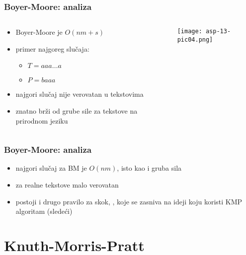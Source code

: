 \documentclass[compress,aspectratio=169]{beamer}
\begin{document}
\begin{frame}[fragile]
  \frametitle{Boyer-Moore: analiza}
  \begin{columns}
    \begin{column}[t]{8cm}
      \begin{itemize}
        \item Boyer-Moore je $O(nm+s)$
        \item primer najgoreg slučaja:
        \begin{itemize}
          \item $T = aaa \ldots a$
          \item $P = baaa$
        \end{itemize}
        \item najgori slučaj nije verovatan u tekstovima
        \item znatno brži od grube sile za tekstove na prirodnom jeziku
      \end{itemize}
    \end{column}
    \begin{column}[t]{8cm}
      \begin{center}
        \texttt{[image: asp-13-pic04.png]}
      \end{center}
    \end{column}
  \end{columns}
\end{frame}

\begin{frame}[fragile]
  \frametitle{Boyer-Moore: analiza}
  \begin{itemize}
    \item najgori slučaj za BM je $O(nm)$, isto kao i gruba sila
    \item za realne tekstove malo verovatan
    \item postoji i drugo pravilo za skok, ,
    koje se zasniva na ideji koju koristi KMP algoritam (sledeći)
  \end{itemize}
\end{frame}

\section[KMP]{Knuth-Morris-Pratt}
\end{document}
